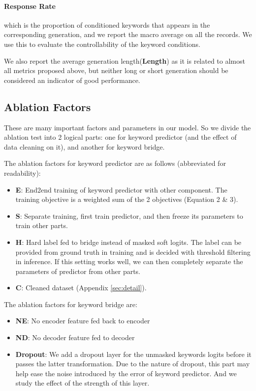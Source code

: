 \documentclass[11pt,a4paper]{article}
\begin{document}
\paragraph{Response Rate} which is the proportion of conditioned keywords that appears in the corresponding generation, and we report the macro average on all the records. We use this to evaluate the controllability of the keyword conditions.

We also report the average generation length(\textbf{Length}) as it is related to almost all metrics proposed above, but neither long or short generation should be considered an indicator of good performance.

\subsection{Ablation Factors}

These are many important factors and parameters in our model. So we divide the ablation test into 2 logical parts: one for keyword predictor (and the effect of data cleaning on it), and another for keyword bridge. 

The ablation factors for keyword predictor are as follows (abbreviated for readability):
\begin{itemize}
  \item \textbf{E}: End2end training of keyword predictor with other component. The training objective is a weighted sum of the 2 objectives (Equation 2 \& 3).
  \item \textbf{S}: Separate training, first train predictor, and then freeze its parameters to train other parts. 
  \item \textbf{H}: Hard label fed to bridge instead of masked soft logits. The label can be provided from ground truth in training and is decided with threshold filtering in inference. If this setting works well, we can then completely separate the parameters of predictor from other parts.
  \item \textbf{C}: Cleaned dataset (Appendix \ref{sec:detail}).
\end{itemize}


The ablation factors for keyword bridge are:
\begin{itemize}
  \item \textbf{NE}: No encoder feature fed back to encoder
  \item \textbf{ND}: No decoder feature fed to decoder
  \item \textbf{Dropout}: We add a dropout layer for the unmasked keywords logits before it passes the latter transformation. Due to the nature of dropout, this part may help ease the noise introduced by the error of keyword predictor. And we study the effect of the strength of this layer.
\end{itemize}
\end{document}
